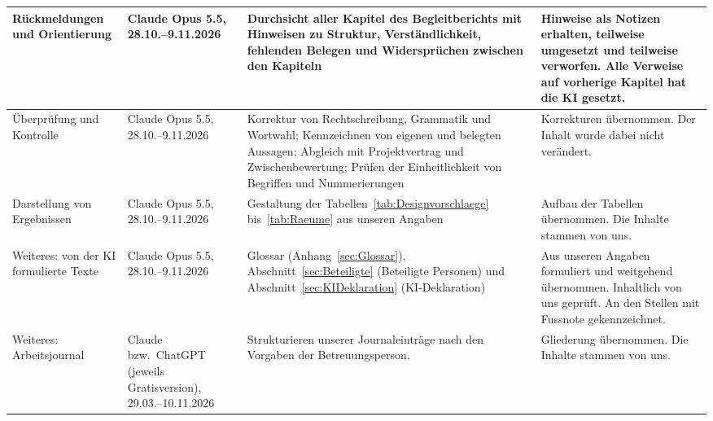 \documentclass[../Main.tex]{subfiles}
\begin{document}
{\begin{longtable}{|>{\raggedright\arraybackslash}p{2.3cm}|>{\raggedright\arraybackslash}p{2.4cm}|>{\raggedright\arraybackslash}p{4.4cm}|>{\raggedright\arraybackslash}p{4.6cm}|}
        \hline
        Rückmeldungen und Orientierung & Claude Opus 5.5, 28.10.--9.11.2026 & Durchsicht aller Kapitel des Begleitberichts mit Hinweisen zu Struktur, Verständlichkeit, fehlenden Belegen und Widersprüchen zwischen den Kapiteln & Hinweise als Notizen erhalten, teilweise umgesetzt und teilweise verworfen. Alle Verweise auf vorherige Kapitel hat die KI gesetzt. \\
        \hline
        Überprüfung und Kontrolle & Claude Opus 5.5, 28.10.--9.11.2026 & Korrektur von Rechtschreibung, Grammatik und Wortwahl; Kennzeichnen von eigenen und belegten Aussagen; Abgleich mit Projektvertrag und Zwischenbewertung; Prüfen der Einheitlichkeit von Begriffen und Nummerierungen & Korrekturen übernommen. Der Inhalt wurde dabei nicht verändert. \\
        \hline
        Darstellung von Ergebnissen & Claude Opus 5.5, 28.10.--9.11.2026 & Gestaltung der Tabellen~\ref{tab:Designvorschlaege} bis~\ref{tab:Raeume} aus unseren Angaben & Aufbau der Tabellen übernommen. Die Inhalte stammen von uns. \\
        \hline
        Weiteres: von der KI formulierte Texte & Claude Opus 5.5, 28.10.--9.11.2026 & Glossar (Anhang~\ref{sec:Glossar}), Abschnitt~\ref{sec:Beteiligte} (Beteiligte Personen) und Abschnitt~\ref{sec:KIDeklaration} (KI-Deklaration) & Aus unseren Angaben formuliert und weitgehend übernommen. Inhaltlich von uns geprüft. An den Stellen mit Fussnote gekennzeichnet. \\
        \hline
        Weiteres: Arbeitsjournal & Claude bzw.\ ChatGPT (jeweils Gratisversion), 29.03.--10.11.2026 & Strukturieren unserer Journaleinträge nach den Vorgaben der Betreuungsperson. & Gliederung übernommen. Die Inhalte stammen von uns. \\
        \hline
    \end{longtable}
}
\end{document}
